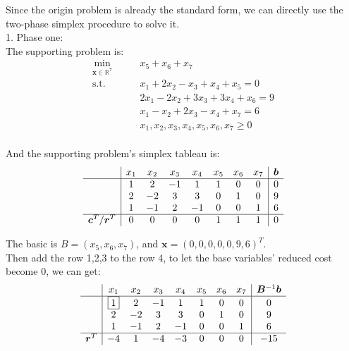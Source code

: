 \documentclass[10pt]{article}
\renewcommand{\mathbf}{\boldsymbol}
\begin{document}
Since the origin problem is already the standard form, we can directly use the two-phase simplex procedure to solve it.\\
1. Phase one:\\
The supporting problem is:\\
\begin{equation}
	\begin{aligned}
		\min_{\bm{x} \in \mathbb{R}^{7}}\qquad & x_5 + x_6 + x_7 \\
		\mathrm{s.t.}\qquad & x_{1} + 2x_{2} - x_{3} + x_{4} + x_5 = 0 \\
							& 2x_{1} - 2x_{2} + 3x_{3} + 3x_{4} + x_6 = 9 \\
							& x_{1} - x_{2} + 2x_{3} - x_{4} + x_7 = 6 \\
							& x_{1}, x_{2}, x_{3}, x_{4}, x_5, x_6, x_7 \geq 0 \\
	\end{aligned}
\end{equation}

And the supporting problem's simplex tableau is:\\
\begin{equation}
	\begin{aligned}
		\begin{array}{c|ccccccc|c}
			& x_1 & x_2 & x_3 & x_4 & x_5 & x_6 & x_7 & \mathbf{b} \\
			\hline
			& 1 & 2 & -1 & 1 & 1 & 0 & 0 & 0 \\
			& 2 & -2 & 3 & 3 & 0 & 1 & 0 & 9 \\
			& 1 & -1 & 2 & -1 & 0 & 0 & 1 & 6 \\
			\hline
			\mathbf{c}^T/\mathbf{r}^T & 0 & 0 & 0 & 0 & 1 & 1 & 1 & 0 \\
		\end{array}
	\end{aligned}
\end{equation}

The basic is $B=(x_5,x_6,x_7)$, and $\mathbf{x}=(0,0,0,0,0,9,6)^T$.\\
Then add the row 1,2,3 to the row 4, to let the base variables' reduced cost become $0$, we can get:\\
\begin{equation}
	\begin{aligned}
		\begin{array}{c|ccccccc|c}
			& x_1 & x_2 & x_3 & x_4 & x_5 & x_6 & x_7 & \mathbf{B}^{-1}\mathbf{b} \\
			\hline
			& \boxed{1} & 2 & -1 & 1 & 1 & 0 & 0 & 0 \\
			& 2 & -2 & 3 & 3 & 0 & 1 & 0 & 9 \\
			& 1 & -1 & 2 & -1 & 0 & 0 & 1 & 6 \\
			\hline
			\mathbf{r}^T & -4 & 1 & -4 & -3 & 0 & 0 & 0 & -15 \\
		\end{array}
	\end{aligned}
\end{equation}
\end{document}
